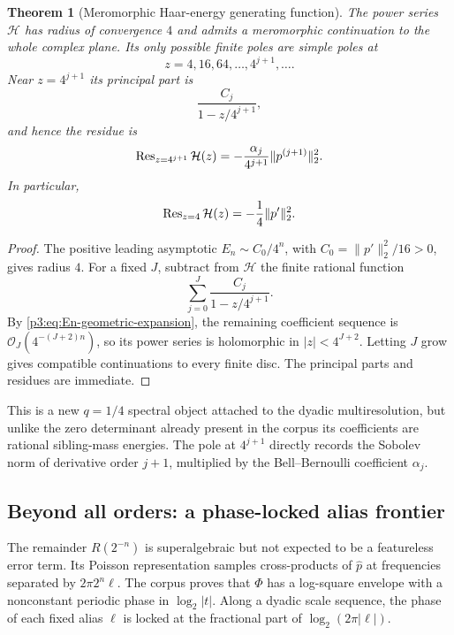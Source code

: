 \documentclass[11pt]{article}
\newtheorem{theorem}{Theorem}[section]
\theoremstyle{definition}
\theoremstyle{remark}
\newcommand{\bigO}{\mathcal O}
\begin{document}
\begin{theorem}[Meromorphic Haar-energy generating function]
\label{p3:thm:H-meromorphic}
The power series $\mathcal H$ has radius of convergence $4$ and admits a
meromorphic continuation to the whole complex plane.  Its only possible finite
poles are simple poles at
\begin{equation}\label{p3:eq:H-poles}
 z=4,16,64,\ldots,4^{j+1},\ldots.
\end{equation}
Near $z=4^{j+1}$ its principal part is
\begin{equation}\label{p3:eq:H-principal-part}
 \frac{C_j}{1-z/4^{j+1}},
\end{equation}
and hence the residue is
\begin{equation}\label{p3:eq:H-residue}
 \operatorname{Res}_{z=4^{j+1}}\mathcal H(z)
 =-\frac{\alpha_j}{4^{j+1}}\|p^{(j+1)}\|_2^2.
\end{equation}
In particular,
\begin{equation}\label{p3:eq:H-first-residue}
 \operatorname{Res}_{z=4}\mathcal H(z)=-\frac1{4}\|p'\|_2^2.
\end{equation}
\end{theorem}

\begin{proof}
The positive leading asymptotic $E_n\sim C_0/4^n$, with
$C_0=\|p'\|_2^2/16>0$, gives radius $4$.  For a fixed $J$, subtract from
$\mathcal H$ the finite rational function
\[
 \sum_{j=0}^{J}\frac{C_j}{1-z/4^{j+1}}.
\]
By \eqref{p3:eq:En-geometric-expansion}, the remaining coefficient sequence is
$\bigO_J(4^{-(J+2)n})$, so its power series is holomorphic in
$|z|<4^{J+2}$.  Letting $J$ grow gives compatible continuations to every finite
disc.  The principal parts and residues are immediate.
\end{proof}

This is a new $q=1/4$ spectral object attached to the dyadic
multiresolution, but unlike the zero determinant already present in the corpus
its coefficients are rational sibling-mass energies.  The pole at $4^{j+1}$
directly records the Sobolev norm of derivative order $j+1$, multiplied by the
Bell--Bernoulli coefficient $\alpha_j$.

\subsection{Beyond all orders: a phase-locked alias frontier}

The remainder $R(2^{-n})$ is superalgebraic but not expected to be a featureless
error term.  Its Poisson representation samples cross-products of
$\widehat p$ at frequencies separated by $2\pi2^n\ell$.  The corpus proves that
$\Phi$ has a log-square envelope with a nonconstant periodic phase in
$\log_2|t|$.  Along a dyadic scale sequence, the phase of each fixed alias
$\ell$ is locked at the fractional part of $\log_2(2\pi|\ell|)$.
\end{document}
